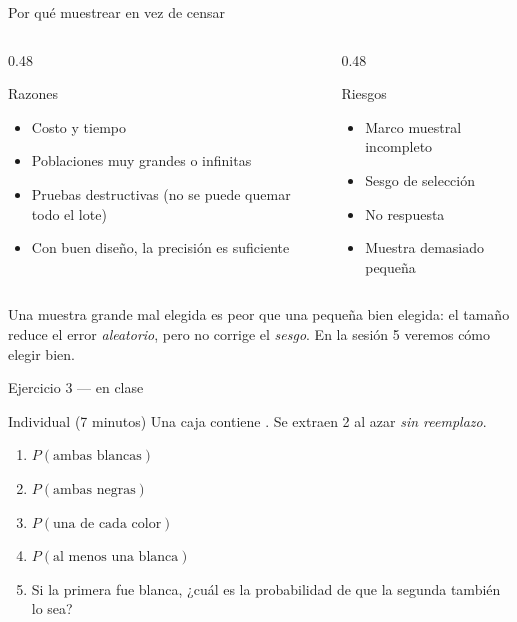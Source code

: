\documentclass[aspectratio=169,10pt]{beamer}
\begin{document}
\begin{frame}{Por qué muestrear en vez de censar}
  \begin{columns}[T,onlytextwidth]
    \begin{column}{0.48\textwidth}
      \begin{block}{Razones}
        \footnotesize
        \begin{itemize}
          \item Costo y tiempo
          \item Poblaciones muy grandes o infinitas
          \item Pruebas destructivas (no se puede quemar todo el lote)
          \item Con buen diseño, la precisión es suficiente
        \end{itemize}
      \end{block}
    \end{column}
    \begin{column}{0.48\textwidth}
      \begin{alertblock}{Riesgos}
        \footnotesize
        \begin{itemize}
          \item Marco muestral incompleto
          \item Sesgo de selección
          \item No respuesta
          \item Muestra demasiado pequeña
        \end{itemize}
      \end{alertblock}
    \end{column}
  \end{columns}

  \vspace{0.25cm}
  {\footnotesize\color{uniGris} Una muestra grande mal elegida es peor que una
  pequeña bien elegida: el tamaño reduce el error \emph{aleatorio}, pero no
  corrige el \emph{sesgo}. En la sesión 5 veremos cómo elegir bien.}
\end{frame}

\begin{frame}{Ejercicio 3 — en clase}
  \begin{alertblock}{Individual (7 minutos)}
    Una caja contiene . Se extraen 2
    al azar \emph{sin reemplazo}.

    \vspace{0.25cm}
    \begin{enumerate}
      \item $P(\text{ambas blancas})$
      \item $P(\text{ambas negras})$
      \item $P(\text{una de cada color})$
      \item $P(\text{al menos una blanca})$
      \item Si la primera fue blanca, ¿cuál es la probabilidad de que la
            segunda también lo sea?
    \end{enumerate}
  \end{alertblock}
\end{frame}
\end{document}
